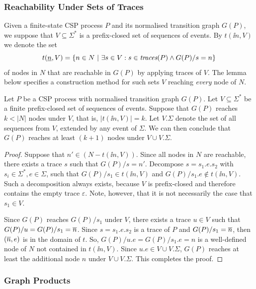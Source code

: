 \subsubsection*{Reachability Under Sets of Traces}
\label{sec:V} Given a finite-state CSP process $P$ and its normalised
transition graph $G(P)$,
we suppose that $V\subseteq\Sigma^*$ is a prefix-closed set  of sequences of
events. By $t(\ii n,V)$ we denote the set
\[
t(\underline{n},V) = \{ n\in N~|~\exists s\in V: s\in\text{\it traces}(P)\wedge G(P)/s = n \}
\]
of nodes in $N$ that are reachable in $G(P)$ by applying traces of $V$. The
lemma below specifies a construction method for such sets $V$ reaching {\it
every} node of $N$.

\begin{lemma}
\label{lemma:extendV} Let $P$ be a CSP process with normalised transition
graph $G(P)$. Let $V\subseteq\Sigma^*$ be a finite prefix-closed set of
sequences of events. Suppose that  $G(P)$ reaches $k < |N|$ nodes under $V$,
that is, $|t(\ii n,V)| = k$. Let $V.\Sigma$ denote the set of all sequences
from $V$, extended by any event of $\Sigma$. We can then conclude that $G(P)$
reaches at least $(k+1)$ nodes under $V\cup V.\Sigma$.
\end{lemma}
\begin{proof}
Suppose that $n'\in (N - t(\ii n,V))$.  Since all nodes in $N$ are reachable,
there exists a trace $s$ such that $G(P)/s = n'$. Decompose $s = s_1.e.s_2$
with $s_i\in\Sigma^*, e\in\Sigma$, such that $G(P)/s_1 \in t(\ii n,V)$ and
$G(P)/s_1.e \not\in t(\ii n,V)$. Such a decomposition always exists, because
$V$ is prefix-closed and therefore contains the empty trace $\varepsilon$.
Note, however, that it is not necessarily the case that $s_1\in V$.

Since $G(P)$ reaches $G(P)/s_1$ under $V$, there exists a trace $u\in V$ such
that $G(P)/u = G(P)/s_1 = \overline n$. Since $s = s_1.e.s_2$ is a trace of $P$ and
$G(P)/s_1 = \overline n$, then $(\overline n,e)$ is in the domain of $t$. So, $ G(P)/u.e
= G(P)/s_1.e = n$ is a well-defined node of $N$ not contained in $t(\ii
n,V)$. Since $u.e\in V\cup V.\Sigma$, $G(P)$ reaches at least the additional
node $n$ under $V\cup V.\Sigma$. This completes the proof. \xbox
\end{proof}

\subsubsection*{Graph Products}
\label{sec:GP}

